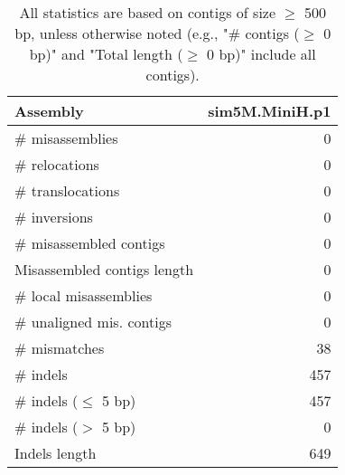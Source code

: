 \documentclass[12pt,a4paper]{article}
\begin{document}
\begin{table}[ht]
\begin{center}
\caption{All statistics are based on contigs of size $\geq$ 500 bp, unless otherwise noted (e.g., "\# contigs ($\geq$ 0 bp)" and "Total length ($\geq$ 0 bp)" include all contigs).}
\begin{tabular}{|l*{1}{|r}|}
\hline
Assembly & sim5M.MiniH.p1 \\ \hline
\# misassemblies & 0 \\ \hline
\hspace{5mm}\# relocations & 0 \\ \hline
\hspace{5mm}\# translocations & 0 \\ \hline
\hspace{5mm}\# inversions & 0 \\ \hline
\# misassembled contigs & 0 \\ \hline
Misassembled contigs length & 0 \\ \hline
\# local misassemblies & 0 \\ \hline
\# unaligned mis. contigs & 0 \\ \hline
\# mismatches & 38 \\ \hline
\# indels & 457 \\ \hline
\hspace{5mm}\# indels ($\leq$ 5 bp) & 457 \\ \hline
\hspace{5mm}\# indels ($>$ 5 bp) & 0 \\ \hline
Indels length & 649 \\ \hline
\end{tabular}
\end{center}
\end{table}
\end{document}
